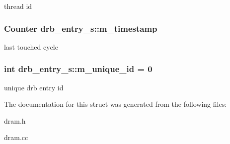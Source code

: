 \label{structdrb__entry__s_a9c4047d6412445c6d01df388fef1a761}
thread id \hypertarget{structdrb__entry__s_a3d8d1a01bae3ed44b066762fc7b06986}{
\subsubsection[{m\_\-timestamp}]{\setlength{\rightskip}{0pt plus 5cm}Counter {\bf drb\_\-entry\_\-s::m\_\-timestamp}}}
\label{structdrb__entry__s_a3d8d1a01bae3ed44b066762fc7b06986}
last touched cycle \hypertarget{structdrb__entry__s_a8023e241d97559b802aed5ded291097b}{
\subsubsection[{m\_\-unique\_\-id}]{\setlength{\rightskip}{0pt plus 5cm}int {\bf drb\_\-entry\_\-s::m\_\-unique\_\-id} = 0}}
\label{structdrb__entry__s_a8023e241d97559b802aed5ded291097b}
unique drb entry id 

The documentation for this struct was generated from the following files:\begin{DoxyCompactItemize}
\item 
dram.h\item 
dram.cc\end{DoxyCompactItemize}
